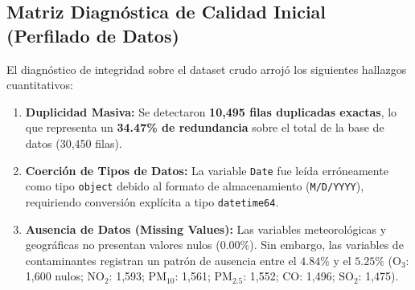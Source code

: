 \documentclass[journal,twocolumn,spanish]{IEEEtran}
\begin{document}
\subsection{Matriz Diagnóstica de Calidad Inicial (Perfilado de Datos)}
El diagnóstico de integridad sobre el dataset crudo arrojó los siguientes hallazgos cuantitativos:
\begin{enumerate}
    \item \textbf{Duplicidad Masiva:} Se detectaron \textbf{10,495 filas duplicadas exactas}, lo que representa un \textbf{34.47\% de redundancia} sobre el total de la base de datos (30,450 filas).
    \item \textbf{Coerción de Tipos de Datos:} La variable \texttt{Date} fue leída erróneamente como tipo \texttt{object} debido al formato de almacenamiento (\texttt{M/D/YYYY}), requiriendo conversión explícita a tipo \texttt{datetime64}.
    \item \textbf{Ausencia de Datos (Missing Values):} Las variables meteorológicas y geográficas no presentan valores nulos ($0.00\%$). Sin embargo, las variables de contaminantes registran un patrón de ausencia entre el $4.84\%$ y el $5.25\%$ ($\text{O}_3$: 1,600 nulos; $\text{NO}_2$: 1,593; $\text{PM}_{10}$: 1,561; $\text{PM}_{2.5}$: 1,552; $\text{CO}$: 1,496; $\text{SO}_2$: 1,475).
\end{enumerate}

\begin{table}[htbp]
\caption{Matriz diagnóstica de calidad de datos inicial}
\label{tab:calidad_inicial}
\centering
{}
\end{table}
\end{document}
